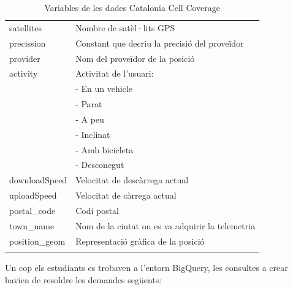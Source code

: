 \documentclass[12pt,longbibliography]{article}
\theoremstyle{definition}
\theoremstyle{remark}
\begin{document}
\begin{longtable}[H]{p{} | p{} }
satellites        & Nombre de satèl·lits GPS                         \\
precission        & Constant que decriu la precisió del proveïdor    \\
provider          & Nom del proveïdor de la posició                  \\
activity          & Activitat de l'usuari:                           \\
                  & - En un vehicle                                  \\
                  & - Parat                                          \\
                  & - A peu                                          \\
                  & - Inclinat                                       \\
                  & - Amb bicicleta                                  \\
                  & - Desconegut                                     \\
downloadSpeed     & Velocitat de descàrrega actual                   \\
uploadSpeed       & Velocitat de càrrega actual                      \\
postal\_code      & Codi postal                                      \\
town\_name        & Nom de la ciutat on es va adquirir la telemetria \\
position\_geom    & Representació gràfica de la posició         \\
\caption{Variables de les dades Catalonia Cell Coverage}
\label{tab:CCC}
\end{longtable}

Un cop els estudiants es trobaven a l'entorn BigQuery, les consultes a crear havien de resoldre les demandes següents:
\end{document}
